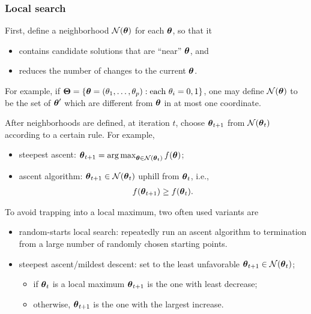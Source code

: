\begin{frame}
  \frametitle{Local search}
  First, define a neighborhood $\mathcal{N}(\boldsymbol{\theta})$ for each $\boldsymbol{\theta}$,
  so that it
  \begin{itemize}
  \item contains candidate solutions that are ``near'' $\boldsymbol{\theta}$, and
  \item reduces the number of changes to the current $\boldsymbol{\theta}$.
  \end{itemize}
  For example, if $\boldsymbol{\Theta}=\{\boldsymbol{\theta} = ({\theta}_1, \ldots, {\theta}_{p}): \text{each
  } \theta_i=0,1\}$, one may define $\mathcal{N}(\boldsymbol{\theta})$ to be the set of
  $\boldsymbol{\theta}'$ which are different from $\boldsymbol{\theta}$ in at most one
  coordinate.
  
  After neighborhoods are defined, at iteration $t$, choose
  $\boldsymbol{\theta}_{t+1}$ from $\mathcal{N}(\boldsymbol{\theta}_t)$ according to a certain
  rule.  For example,
  \begin{itemize}
  \item steepest ascent:
    $\boldsymbol{\theta}_{t+1} = \mathop{\arg\max}_{\boldsymbol{\theta}\in
      \mathcal{N}(\boldsymbol{\theta}_t)} f(\boldsymbol{\theta})$;
  \item ascent algorithm: $\boldsymbol{\theta}_{t+1}\in \mathcal{N}(\boldsymbol{\theta}_t)$
    uphill from $\boldsymbol{\theta}_t$, i.e.,
    \begin{align*}
      f(\boldsymbol{\theta}_{t+1})\ge f(\boldsymbol{\theta}_t).
    \end{align*}
  \end{itemize}

\end{frame}


\begin{frame}
  To avoid trapping into a local maximum, two often used variants are
  \begin{itemize}
  \item random-starts local search: repeatedly run an ascent algorithm
    to termination from a large number of randomly chosen
    starting points.
  \item steepest ascent/mildest descent: set to the least unfavorable
    $\boldsymbol{\theta}_{t+1} \in \mathcal{N}(\boldsymbol{\theta}_t)$;
    \begin{itemize}
    \item if $\boldsymbol{\theta}_t$ is a local maximum $\boldsymbol{\theta}_{t+1}$ is the
      one with least decrease;
    \item otherwise, $\boldsymbol{\theta}_{t+1}$ is the one with the largest
      increase.
    \end{itemize}
  \end{itemize}

\end{frame}


